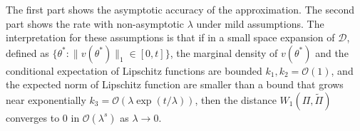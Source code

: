 \documentclass[10pt,fleqn]{article}
\newcommand{\mc}[1]{\mathcal{#1}}
\DeclareMathOperator{\1}{\mathbbm{1}}
\begin{document}
        


The first part shows the asymptotic accuracy of the approximation. The second part shows the rate with non-asymptotic $\lambda$ under mild assumptions. The interpretation for these assumptions is that if in a small space expansion of $\mc D$, defined as $\{\theta^*: \|v(\theta^*)\|_{1}\in [0,t] \}$, the marginal density of $v(\theta^*)$ and the conditional expectation of Lipschitz functions are bounded $k_1,k_2= \mc O(1)$, and the expected norm of Lipschitz function are smaller than a bound that grows near exponentially $k_3 = \mc O(\lambda \exp(t/\lambda))$, then the distance $W_1(\Pi,\tilde\Pi)$ converges to $0$ in $\mc O(\lambda^s)$ as $\lambda\rightarrow 0$.





\end{document}
